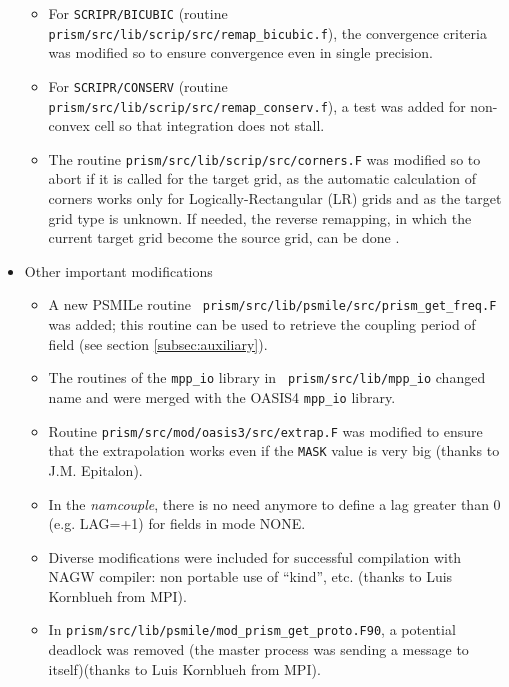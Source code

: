 \begin{itemize}
\begin{itemize}
  \item For {\tt SCRIPR/BICUBIC} (routine {\tt
      prism/src/lib/scrip/src/remap\_bicubic.f}), the convergence
    criteria was modified so to ensure convergence even in single
    precision.

  \item For {\tt SCRIPR/CONSERV} (routine {\tt
      prism/src/lib/scrip/src/remap\_conserv.f}), a test was added for
    non-convex cell so that integration does not stall.

  \item The routine {\tt prism/src/lib/scrip/src/corners.F} was
    modified so to abort if it is called for the target grid, as the
    automatic calculation of corners works only for
    Logically-Rectangular (LR) grids and as the target grid type is
    unknown. If needed, the reverse remapping, in which the current
    target grid become the source grid, can be done .

  \end{itemize}

\item Other important modifications

  \begin{itemize}

  \item A new PSMILe routine {\tt
      prism/src/lib/psmile/src/prism\_get\_freq.F} was added; this
    routine can be used to retrieve the coupling period of field (see
    section \ref{subsec:auxiliary}).

  \item The routines of the {\tt mpp\_io} library in {\tt
      prism/src/lib/mpp\_io} changed name and were merged with the
    OASIS4 {\tt mpp\_io} library.

  \item Routine {\tt prism/src/mod/oasis3/src/extrap.F} was modified
    to ensure that the extrapolation works even if the {\tt MASK}
    value is very big (thanks to J.M. Epitalon).

  \item In the {\it namcouple}, there is no need anymore to define a lag
    greater than 0 (e.g.  LAG=+1) for fields in mode NONE.

  \item Diverse modifications were included for successful compilation
    with NAGW compiler: non portable use of ``kind'', etc. (thanks to
    Luis Kornblueh from MPI).

  \item In {\tt prism/src/lib/psmile/mod\_prism\_get\_proto.F90}, a
    potential deadlock was removed (the master process was sending a
    message to itself)(thanks to Luis Kornblueh from MPI).


\end{itemize}
\end{itemize}

